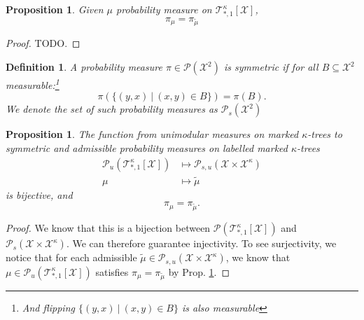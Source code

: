 \documentclass[12pt]{article}
\newtheorem{proposition}[theorem]{Proposition}
\newtheorem{definition}[theorem]{Definition}
\numberwithin{equation}{section}
\begin{document}

\begin{proposition}
    Given $\mu$ probability measure on $\mathcal{T}^\kappa_{*, 1}[\mathcal{X}]$,
    \begin{equation*}
        \pi_\mu = \pi_{\widetilde{\mu}}
    \end{equation*}
\end{proposition}

\begin{proof}
    TODO.
\end{proof}

\begin{definition}
    A probability measure $\pi\in \mathcal{P}(\mathcal{X}^2)$ is symmetric if for all $B\subseteq \mathcal{X}^2$ measurable:\footnote{And flipping $\{(y, x)\ |\ (x,y)\in B\}$ is also measurable}
    \begin{equation*}
        \pi(\{(y, x)\ |\ (x,y)\in B\}) = \pi(B).
    \end{equation*}
    We denote the set of such probability measures as $\mathcal{P}_s(\mathcal{X}^2)$
\end{definition}

\begin{proposition}\label{Prp.XY-tilde-PI-eq}
    The function from unimodular measures on marked $\kappa$-trees to symmetric and admissible probability measures on labelled marked $\kappa$-trees
    \begin{align*}
        \mathcal{P}_u(\mathcal{T}^\kappa_{*, 1}[\mathcal{X}]) & \mapsto \mathcal{P}_{s, u}(\mathcal{X}\times\mathcal{X}^\kappa) \\
        \mu                                                   & \mapsto\widetilde{\mu}
    \end{align*}
    is bijective, and
    \begin{equation*}
        \pi_\mu = \pi_{\widetilde{\mu}}.
    \end{equation*}
\end{proposition}

\begin{proof}
    We know that this is a bijection between $\mathcal{P}(\mathcal{T}^\kappa_{*, 1}[\mathcal{X}])$ and $\mathcal{P}_s(\mathcal{X}\times\mathcal{X}^\kappa)$. We can therefore guarantee injectivity. To see surjectivity, we notice that for each admissible
    $\widetilde{\mu}\in \mathcal{P}_{s, u}(\mathcal{X}\times\mathcal{X}^\kappa)$, we know that
    $\mu\in \mathcal{P}_u(\mathcal{T}^\kappa_{*, 1}[\mathcal{X}])$ satisfies $\pi_\mu = \pi_{\widetilde{\mu}}$ by Prop. \ref{Prp.XY-tilde-PI-eq}.
\end{proof}
\end{document}

